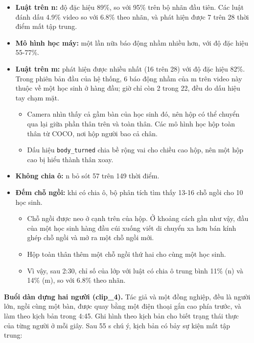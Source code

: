 \begin{itemize}
\tightlist
\item
  \textbf{Luật trên n:} độ đặc hiệu 89\%, so với 95\% trên bộ nhãn đầu tiên. Các luật đánh dấu 4.9\% video so với 6.8\% theo nhãn, và phát hiện được 7 trên 28 thời điểm mất tập trung.
\item
  \textbf{Mô hình học máy:} một lần nữa báo động nhầm nhiều hơn, với độ đặc hiệu 55-77\%.
\item
  \textbf{Luật trên m:} phát hiện được nhiều nhất (16 trên 28) với độ đặc hiệu 82\%. Trong phiên bản đầu của hệ thống, 6 báo động nhầm của m trên video này thuộc về một học sinh ở hàng đầu; giờ chỉ còn 2 trong 22, đều do dấu hiệu tay chạm mặt.

  \begin{itemize}
  \tightlist
  \item
    Camera nhìn thấy cả gầm bàn của học sinh đó, nên hộp có thể chuyển qua lại giữa phần thân trên và toàn thân. Các mô hình học hộp toàn thân từ COCO, nơi hộp người bao cả chân.
  \item
    Dấu hiệu \texttt{body\_turned} chia bề rộng vai cho chiều cao hộp, nên một hộp cao bị hiểu thành thân xoay.
  \end{itemize}
\item
  \textbf{Không chia ô:} n bỏ sót 57 trên 149 thời điểm.
\item
  \textbf{Đếm chỗ ngồi:} khi có chia ô, bộ phân tích tìm thấy 13-16 chỗ ngồi cho 10 học sinh.

  \begin{itemize}
  \tightlist
  \item
    Chỗ ngồi được neo ở cạnh trên của hộp. Ở khoảng cách gần như vậy, đầu của một học sinh hàng đầu cúi xuống viết di chuyển xa hơn bán kính ghép chỗ ngồi và mở ra một chỗ ngồi mới.
  \item
    Hộp toàn thân thêm một chỗ ngồi thứ hai cho cùng một học sinh.
  \item
    Vì vậy, sau 2:30, chỉ số của lớp với luật có chia ô trung bình 11\% (n) và 14\% (m), so với 6.8\% theo nhãn.
  \end{itemize}
\end{itemize}

\textbf{Buổi dàn dựng hai người (clip\_4).} Tác giả và một đồng nghiệp, đều là người lớn, ngồi cùng một bàn, được quay bằng một điện thoại gắn cao phía trước, và làm theo kịch bản trong 4:45. Ghi hình theo kịch bản cho biết trạng thái thực của từng người ở mỗi giây. Sau 55 s chú ý, kịch bản có bảy sự kiện mất tập trung:

